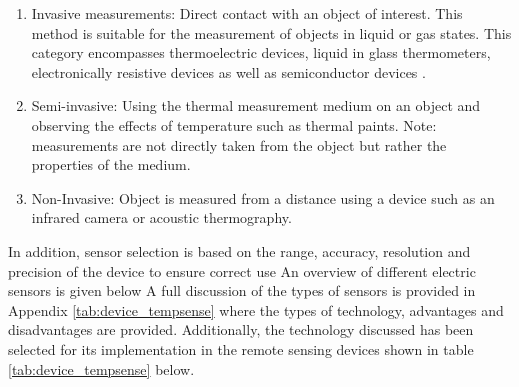 \begin{enumerate}
	\item Invasive measurements: Direct contact with an object of interest. This method is suitable for the measurement of objects in liquid or gas states. This category encompasses thermoelectric devices, liquid in glass thermometers, electronically resistive devices as well as semiconductor devices \cite{mansoor2015silicon}.
	\item Semi-invasive: Using the thermal measurement medium on an object and observing the effects of temperature such as thermal paints. Note: measurements are not directly taken from the object but rather the properties of the medium.
	\item Non-Invasive: Object is measured from a distance using a device such as an infrared camera or acoustic thermography.
\end{enumerate}


In addition, sensor selection is based on the range, accuracy, resolution and precision of the device to ensure correct use An overview of different electric sensors is given below \cite{childs2000review} A full discussion of the types of sensors is provided in Appendix \ref{tab:device_tempsense} where the types of technology, advantages and disadvantages are provided. Additionally, the technology discussed has been selected for its implementation in the remote sensing devices shown in table \ref{tab:device_tempsense} below.
 
